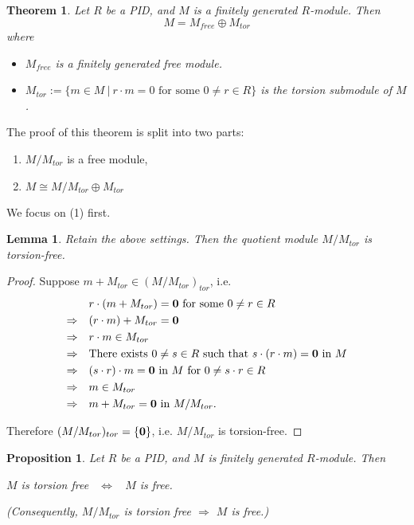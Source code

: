 \documentclass[11pt,openany]{book}
\theoremstyle{plain}
\newtheorem{theorem}{Theorem}[chapter]
\newtheorem{lemma}[lemma]{Lemma}
\newtheorem{proposition}[proposition]{Proposition}
\theoremstyle{definition}
\theoremstyle{remark}
\begin{document}
\begin{theorem}
    Let $R$ be a PID, and $M$ is a finitely generated $R$-module. Then
    $$M = M_{free}\oplus M_{tor}$$
    where
    \begin{itemize}
        \item $M_{free}$ is a finitely generated free module.
        \item $M_{tor}:=\{m\in M\ |\ r\cdot m=0\text{ for some }0\neq r\in R\}$ is the torsion submodule of $M$.
    \end{itemize}
\end{theorem}

The proof of this theorem is split into two parts:
\begin{enumerate}
    \item $M/M_{tor}$ is a free module,
    \item $M\cong M/M_{tor}\oplus M_{tor}$
\end{enumerate}

\medskip
We focus on (1) first. 
\begin{lemma}
Retain the above settings. Then the quotient module $M/M_{tor}$ is torsion-free.
\end{lemma}
\begin{proof}
Suppose $m+M_{tor}\in (M/M_{tor})_{tor}$, i.e.
    \begin{align*}
        &\quad r\cdot (m+M_{tor})={\bf 0}\text{ for some }0\neq r\in R\\
        \Rightarrow &\quad(r\cdot m)+M_{tor}={\bf 0}\\
        \Rightarrow &\quad r\cdot m\in M_{tor}\\
        \Rightarrow &\quad\text{There exists }0\neq s\in R\text{ such that }s\cdot(r\cdot m)={\bf 0}\text{ in }M\\
        \Rightarrow &\quad(s\cdot r)\cdot m={\bf 0}\text{ in }M\ \text{for}\ 0 \neq s\cdot r \in R\\
        \Rightarrow &\quad m\in M_{tor}\\
        \Rightarrow &\quad m+M_{tor}={\bf 0}\text{ in }M/M_{tor}.
    \end{align*}

    
    Therefore $(M/M_{tor})_{tor}=\{{\bf 0}\}$, i.e. $M/M_{tor}$ is torsion-free.
\end{proof}

\begin{proposition}
    Let $R$ be a PID, and $M$ is finitely generated $R$-module. Then
    \begin{center}
        $M$ is torsion free \ $\Leftrightarrow$ \ $M$ is free.
    \end{center}
    (Consequently, $M/M_{tor}$ is torsion free $\Rightarrow$ $M$ is free.)
\end{proposition}
\end{document}
